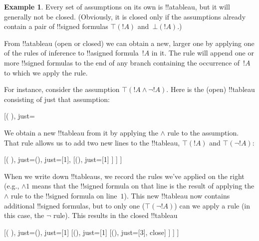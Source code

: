 \documentclass[10pt,a4paper]{article}
\theoremstyle{plain}
\theoremstyle{definition}
\newtheorem{ex}[thm]{Example}
\theoremstyle{remark}
\providecommand{\sFmla}[2]{#1(#2)}
\providecommand{\formula}{\relax}
\providecommand{\True}{\top}
\providecommand{\False}{\bot}
\providecommand{\TAss}[1]{}
\providecommand{\TRule}[1]{}
\providecommand{\formula}[1]{#1}
\begin{document}
\begin{ex}
  Every set of assumptions on its own is !!a{tableau}, but it will
  generally not be closed. (Obviously, it is closed only if the
  assumptions already contain a pair of !!{signed formula}s
  $\sFmla{\True}{!A}$ and~$\sFmla{\False}{!A}$.)

  From !!a{tableau} (open or closed) we can obtain a new, larger one by
  applying one of the rules of inference to !!a{signed formula}~$!A$
  in it. The rule will append one or more !!{signed formula}s to the end of
  any branch containing the occurrence of~$!A$ to which we apply the
  rule.

  For instance, consider the assumption $\sFmla{\True}{!A \land \lnot
    !A}$. Here is the (open) !!{tableau} consisting of just that
  assumption:
  \begin{center}
    \begin{tableau}{}
      [\sFmla{\True}{\formula{A} \land \lnot \formula{A}}, just=\TAss]
    \end{tableau}{}
  \end{center}
  We obtain a new !!{tableau} from it by applying the $\TRule{\True}{\land}$
  rule to the assumption. That rule allows us to add two new lines to
  the !!{tableau}, $\sFmla{\True}{!A}$ and $\sFmla{\True}{\lnot !A}$:
  \begin{center}
    \begin{tableau}{}
      [\sFmla{\True}{\formula{A} \land \lnot \formula{A}}, just=\TAss
        [\sFmla{\True}{\formula{A}}, just={\TRule{\True}{\land}[1]},
          [\sFmla{\True}{\lnot \formula{A}}, just={\TRule{\True}{\land}[1]}
          ]
        ]
      ]
    \end{tableau}{}
  \end{center}
  When we write down !!{tableau}s, we record the rules we've applied
  on the right (e.g., $\TRule{\True}{\land} 1$ means that the
  !!{signed formula} on that line is the result of applying the
  $\TRule{\True}{\land}$ rule to the !!{signed formula} on line~$1$).
  This new !!{tableau} now contains additional !!{signed formula}s,
  but to only one ($\sFmla{\True}{\lnot !A}$) can we apply a rule (in
  this case, the $\TRule{\True}{\lnot}$ rule). This results in the closed
  !!{tableau}
  \begin{center}
    \begin{tableau}{}
      [\sFmla{\True}{\formula{A} \land \lnot \formula{A}}, just=\TAss
        [\sFmla{\True}{\formula{A}}, just={\TRule{\True}{\land}[1]}
          [\sFmla{\True}{\lnot \formula{A}}, just={\TRule{\True}{\land}[1]}
            [\sFmla{\False}{\formula{A}}, just={\TRule{\True}{\lnot}[3]}, close]
          ]
        ]
      ]
    \end{tableau}{}
  \end{center}
\end{ex}
\end{document}
